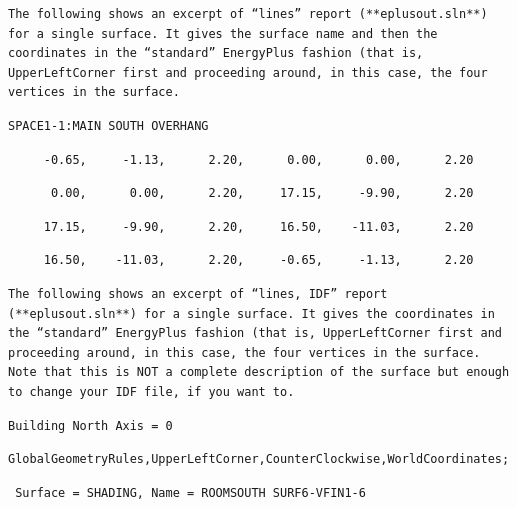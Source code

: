\begin{lstlisting}
The following shows an excerpt of “lines” report (**eplusout.sln**) for a single surface. It gives the surface name and then the coordinates in the “standard” EnergyPlus fashion (that is, UpperLeftCorner first and proceeding around, in this case, the four vertices in the surface.
\end{lstlisting}

\begin{lstlisting}
SPACE1-1:MAIN SOUTH OVERHANG
\end{lstlisting}

\begin{lstlisting}
     -0.65,     -1.13,      2.20,      0.00,      0.00,      2.20
\end{lstlisting}

\begin{lstlisting}
      0.00,      0.00,      2.20,     17.15,     -9.90,      2.20
\end{lstlisting}

\begin{lstlisting}
     17.15,     -9.90,      2.20,     16.50,    -11.03,      2.20
\end{lstlisting}

\begin{lstlisting}
     16.50,    -11.03,      2.20,     -0.65,     -1.13,      2.20
\end{lstlisting}

\begin{lstlisting}
The following shows an excerpt of “lines, IDF” report (**eplusout.sln**) for a single surface. It gives the coordinates in the “standard” EnergyPlus fashion (that is, UpperLeftCorner first and proceeding around, in this case, the four vertices in the surface. Note that this is NOT a complete description of the surface but enough to change your IDF file, if you want to.
\end{lstlisting}

\begin{lstlisting}
Building North Axis = 0
\end{lstlisting}

\begin{lstlisting}
GlobalGeometryRules,UpperLeftCorner,CounterClockwise,WorldCoordinates;
\end{lstlisting}

\begin{lstlisting}
 Surface = SHADING, Name = ROOMSOUTH SURF6-VFIN1-6
\end{lstlisting}

